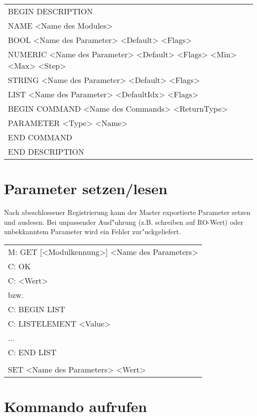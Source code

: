 \begin{center}
\begin{tabular*}{350pt}{l}
BEGIN DESCRIPTION \\
NAME <Name des Modules>\\
BOOL <Name des Parameter> <Default> <Flags>\\
NUMERIC <Name des Parameter> <Default> <Flags> <Min> <Max> <Step>\\
STRING <Name des Parameter> <Default> <Flags>\\
LIST <Name des Parameter> <DefaultIdx> <Flags>\\
BEGIN COMMAND <Name des Commands> <ReturnType>\\
PARAMETER <Type> <Name>\\
END COMMAND\\
END DESCRIPTION\\
\end{tabular*}
\end{center}

\section{Parameter setzen/lesen}

Nach abeschlossener Registrierung kann der Master exportierte Parameter setzen und auslesen.
Bei unpassender Ausf"uhrung (z.B. schreiben auf RO-Wert) oder unbekkanntem Parameter wird 
ein Fehler zur"uckgeliefert. 

\begin{center}
\begin{tabular*}{350pt}{l}
M: GET [<Modulkennung>] <Name des Parameters>\\
C: OK \\ 
C: <Wert>\\
bzw. \\
C: BEGIN LIST\\
C: LISTELEMENT <Value>\\
...\\
C: END LIST\\
\\
SET <Name des Parameters> <Wert>\\
\end{tabular*}
\end{center}

\section{Kommando aufrufen}

